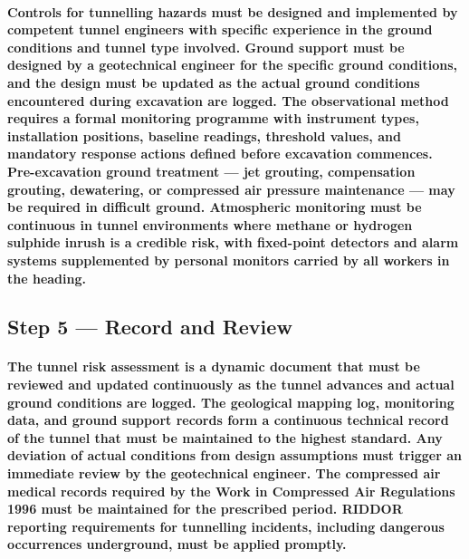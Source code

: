 \paragraph{Controls for tunnelling hazards must be designed and implemented by competent tunnel engineers with specific experience in the ground conditions and tunnel type involved. Ground support must be designed by a geotechnical engineer for the specific ground conditions, and the design must be updated as the actual ground conditions encountered during excavation are logged. The observational method requires a formal monitoring programme with instrument types, installation positions, baseline readings, threshold values, and mandatory response actions defined before excavation commences. Pre-excavation ground treatment --- jet grouting, compensation grouting, dewatering, or compressed air pressure maintenance --- may be required in difficult ground. Atmospheric monitoring must be continuous in tunnel environments where methane or hydrogen sulphide inrush is a credible risk, with fixed-point detectors and alarm systems supplemented by personal monitors carried by all workers in the heading.}

\subsection{Step 5 --- Record and Review}
\paragraph{The tunnel risk assessment is a dynamic document that must be reviewed and updated continuously as the tunnel advances and actual ground conditions are logged. The geological mapping log, monitoring data, and ground support records form a continuous technical record of the tunnel that must be maintained to the highest standard. Any deviation of actual conditions from design assumptions must trigger an immediate review by the geotechnical engineer. The compressed air medical records required by the Work in Compressed Air Regulations 1996 must be maintained for the prescribed period. RIDDOR reporting requirements for tunnelling incidents, including dangerous occurrences underground, must be applied promptly.}

